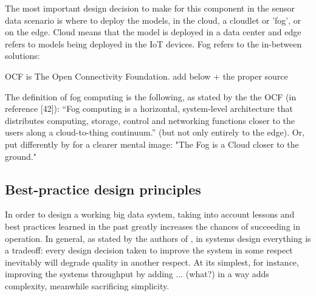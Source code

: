 The most important design decision to make for this component in the sensor data scenario is where to deploy the models, in the cloud, a cloudlet or 'fog', or on the edge. Cloud means that the model is deployed in a data center and edge refers to models being deployed in the IoT devices. Fog refers to the in-between solutions: 

OCF is The Open Connectivity Foundation. add below + the proper source

The definition of fog computing is the following, as stated by the the OCF (in \cite{fogsurvey} reference [42]): “Fog computing is a horizontal, system-level architecture that distributes computing, storage, control and networking functions closer to the users along a cloud-to-thing continuum.” (but not only entirely to the edge). Or, put differently by \cite{fogsurvey} for a clearer mental image: "The Fog is a Cloud closer to the ground."
\subsection{Best-practice design principles}








In order to design a working big data system, taking into account lessons and best practices learned in the past greatly increases the chances of succeeding in operation. In general, as stated by the authors of \cite{uber}, in systems design everything is a tradeoff: every design decision taken to improve the system in some respect inevitably will degrade quality in another respect. At its simplest, for instance, improving the systems throughput by adding ... (what?) in a way adds complexity, meanwhile sacrificing simplicity.

